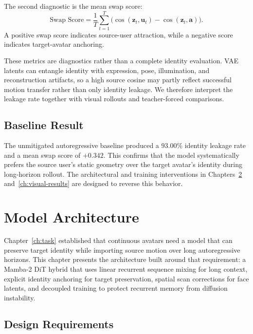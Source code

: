 \documentclass[12pt,letterpaper]{report}
\begin{document}
The second diagnostic is the mean swap score:
\begin{equation}
    \text{Swap Score} = \frac{1}{T} \sum_{t=1}^{T} \Big( \cos(\mathbf{z}_t, \mathbf{u}_t) - \cos(\mathbf{z}_t, \mathbf{a}) \Big).
\end{equation}
A positive swap score indicates source-user attraction, while a negative score indicates target-avatar anchoring.

These metrics are diagnostics rather than a complete identity evaluation. VAE latents can entangle identity with expression, pose, illumination, and reconstruction artifacts, so a high source cosine may partly reflect successful motion transfer rather than only identity leakage. We therefore interpret the leakage rate together with visual rollouts and teacher-forced comparisons.

\section{Baseline Result}

The unmitigated autoregressive baseline produced a 93.00\% identity leakage rate and a mean swap score of $+0.342$. This confirms that the model systematically prefers the source user's static geometry over the target avatar's identity during long-horizon rollout. The architectural and training interventions in Chapters~\ref{ch:architecture} and~\ref{ch:visual-results} are designed to reverse this behavior.

\chapter{Model Architecture}\label{ch:architecture}

Chapter~\ref{ch:task} established that continuous avatars need a model that can preserve target identity while importing source motion over long autoregressive horizons. This chapter presents the architecture built around that requirement: a Mamba-2 DiT hybrid that uses linear recurrent sequence mixing for long context, explicit identity anchoring for target preservation, spatial scan corrections for face latents, and decoupled training to protect recurrent memory from diffusion instability.

\section{Design Requirements}\label{sec:design-requirements}
\end{document}
